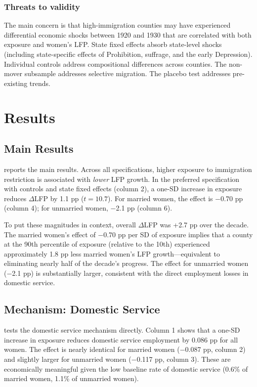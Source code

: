 \documentclass[12pt]{article}
\begin{document}
\subsubsection*{Threats to validity} The main concern is that high-immigration counties may have experienced differential economic shocks between 1920 and 1930 that are correlated with both exposure and women's LFP. State fixed effects absorb state-level shocks (including state-specific effects of Prohibition, suffrage, and the early Depression). Individual controls address compositional differences across counties. The non-mover subsample addresses selective migration. The placebo test addresses pre-existing trends.


\section{Results}

\subsection{Main Results}



 reports the main results. Across all specifications, higher exposure to immigration restriction is associated with \emph{lower} LFP growth. In the preferred specification with controls and state fixed effects (column 2), a one-SD increase in exposure reduces $\Delta$LFP by 1.1 pp ($t = 10.7$). For married women, the effect is $-$0.70 pp (column 4); for unmarried women, $-$2.1 pp (column 6).

To put these magnitudes in context, overall $\Delta$LFP was +2.7 pp over the decade. The married women's effect of $-$0.70 pp per SD of exposure implies that a county at the 90th percentile of exposure (relative to the 10th) experienced approximately 1.8 pp less married women's LFP growth---equivalent to eliminating nearly half of the decade's progress. The effect for unmarried women ($-$2.1 pp) is substantially larger, consistent with the direct employment losses in domestic service.


\subsection{Mechanism: Domestic Service}



 tests the domestic service mechanism directly. Column 1 shows that a one-SD increase in exposure reduces domestic service employment by 0.086 pp for all women. The effect is nearly identical for married women ($-$0.087 pp, column 2) and slightly larger for unmarried women ($-$0.117 pp, column 3). These are economically meaningful given the low baseline rate of domestic service (0.6\% of married women, 1.1\% of unmarried women).
\end{document}
